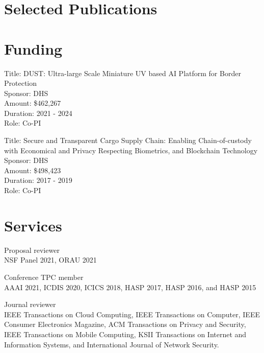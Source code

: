 \section*{Selected Publications}

\begin{enumerate}[{[1]}, nosep]
    \item {}
\end{enumerate}


\section*{Funding}
\begin{compactitem}
    \item Title: DUST: Ultra-large Scale Miniature UV based AI Platform for Border Protection\\
    Sponsor: DHS\\
    Amount: \$462,267\\
    Duration: 2021 - 2024\\
    Role: Co-PI
    \item 	Title: Secure and Transparent Cargo Supply Chain: Enabling Chain-of-custody with Economical and Privacy Respecting Biometrics, and Blockchain Technology\\
    Sponsor: DHS\\
    Amount: \$498,423\\
    Duration: 2017 - 2019\\
    Role: Co-PI
\end{compactitem}

\section*{Services}
\begin{compactitem}
    \item Proposal reviewer\\
    NSF Panel 2021, ORAU 2021
    \item Conference TPC member\\
    AAAI 2021, ICDIS 2020, ICICS 2018, HASP 2017, HASP 2016, and HASP 2015
    \item Journal reviewer \\
    IEEE Transactions on Cloud Computing, IEEE Transactions on Computer, IEEE Consumer Electronics Magazine, ACM Transactions on Privacy and Security, IEEE Transactions on Mobile Computing, KSII Transactions on Internet and Information Systems, and International Journal of Network Security.
\end{compactitem}

